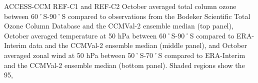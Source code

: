 ACCESS-CCM REF-C1 and REF-C2 October averaged total column ozone between 60˚S-90˚S compared to observations from the Bodeker Scientific Total Ozone Column Database and the CCMVal-2 ensemble median (top panel), October averaged temperature at 50 hPa between 60˚S-90˚S compared to ERA-Interim data and the CCMVal-2 ensemble median (middle panel), and October averaged zonal wind at 50 hPa between 50˚S-70˚S compared to ERA-Interim and the CCMVal-2 ensemble median (bottom panel). Shaded regions show the 95,\\%
